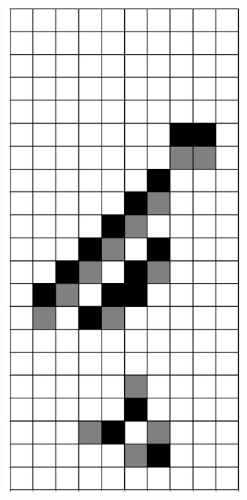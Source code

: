 \documentclass[12pt]{article}
\numberwithin{figure}{section} %
\begin{document}
\begin{figure}[H]
\begin{subfigure}{0.3\textwidth}
     		\subcaption{}
   	\end{subfigure}
     	\begin{subfigure}{0.3\textwidth}
     		\centering
     		\includegraphics[angle=270,width=\linewidth]{Section4/23.4}

\end{subfigure}
\end{figure}
\end{document}
